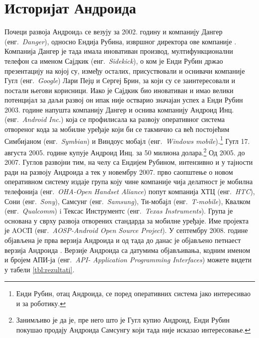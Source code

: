 \documentclass[12pt,oneside]{memoir}
\theoremstyle{remark}
\begin{document}
\section{Историјат Андроида}
Почеци развоја Андроидa се везују за 2002. годину и компанију Дангер (енг.~{\em Danger}), односно Ендија Рубина, извршног директора ове компаније \cite{paplukic}. Компанија Дангер је тада имала иновативан производ, мултифункционални телефон са именом Сајдкик (енг.~{\em Sidekick}), о ком је Енди Рубин држао презентацију на којој су, између осталих, присуствовали и оснивачи компаније Гугл (енг.~{\em Google}) Лари Пејџ и Сергеј Брин, за који су се заинтересовали и постали његови корисници. Иако је Сајдкик био иновативан и имао велики потенцијал за даљи развој он ипак није остварио значајан успех а Енди Рубин 2003. године напушта компанију Дангер и оснива компанију Андроид Инц. (енг.~{\em Android Inc.})  која се профилисала ка развоју оперативног система отвореног кода за мобилне уређаје који би се такмичио са већ постојећим Симбијаном (енг.~{\em Symbian}) и Виндоус мобајл (енг.~{\em Windows mobile}).\footnote{Енди Рубин, отац Андроида, се поред оперативних система јако интересивао и за роботику.} Гугл 17. августа 2005. године купује Андроид Инц.  за 50 милиона долара.\footnote{Занимљиво је да је, пре него што је Гугл купио Андроид, Енди Рубин покушао продају Андроида Самсунгу који тада није исказао интересовање. } Од 2005. до 2007. Гуглов развојни тим, на челу са Ендијем Рубином, интензивно и у тајности ради на развоју Андроида а тек у новембру 2007. прво саопштење о новом оперативном систему издаје група коју чине компаније чија делатност је мобилна телефонија (енг.~{\em OHA-Open Handset Aliance}) попут компанија ХТЦ (енг.~{\em HTC}), Сони (енг.~{\em Sony}), Самсунг (енг.~{\em Samsung}), Ти-мобајл (енг.~{\em T-mobile}), Квалком (енг.~{\em Qualcomm}) i Тексас Инструментс (енг.~{\em Texas Instruments}). Група је основана у сврху развоја отворених стандарда за мобилне уређаје. Име пројекта је AOCП (енг.~{\em AOSP-Android Open Source Project}). У септембру 2008. године објављена је прва верзија Андроида и од тада до данас је објављено петнаест верзија Андроида \cite{historyandroid}. Верзије Андроида са датумима објављивања, кодним именом и бројем АПИ-ја (енг.~{\em API- Application Programming Interfaces}) можете видети у табели  \ref{tbl:rezultati}.
\end{document}
